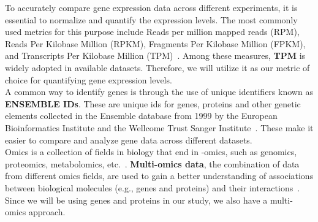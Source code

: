 To accurately compare gene expression data across different experiments, it is essential to normalize and quantify the expression levels.
The most commonly used metrics for this purpose include Reads per million mapped reads (RPM),
Reads Per Kilobase Million (RPKM), Fragments Per Kilobase Million (FPKM),
and Transcripts Per Kilobase Million (TPM)~\cite{cd_geneomics_gene_expression}.
Among these measures, \textbf{TPM} is widely adopted in available datasets.
Therefore, we will utilize it as our metric of choice for quantifying gene expression levels.
\\

A common way to identify genes is through the use of unique identifiers known as \textbf{ENSEMBLE IDs}.
These are unique ids for genes, proteins and other genetic elements collected in the Ensemble database
from 1999 by the European Bioinformatics Institute and the Wellcome Trust Sanger Institute~\cite{ensembl_project}.
These make it easier to compare and analyze gene data across different datasets.
\\

Omics is a collection of fields in biology that end in -omics, such as genomics, proteomics, metabolomics, etc.~\cite{subedi2022omics}.
\textbf{Multi-omics data}, the combination of data from different omics fields,
are used to gain a better understanding of associations between biological molecules (e.g., genes and proteins)
and their interactions~\cite{Subramanian2020MultiomicsDI}.
Since we will be using genes and proteins in our study, we also have a multi-omics approach.
\\
